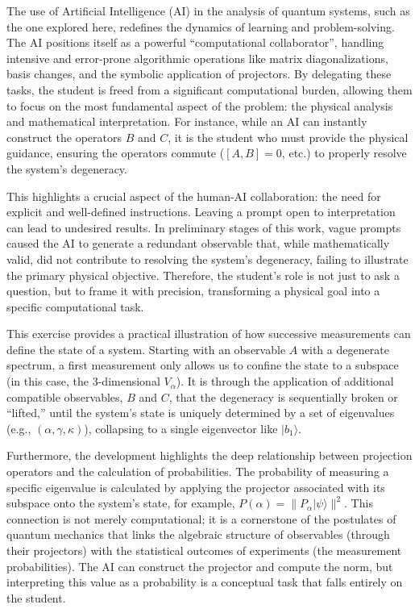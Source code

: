 \documentclass[11pt,a4paper]{article}
\begin{document}
  The use of Artificial Intelligence (AI) in the analysis of quantum systems,
  such as the one explored here, redefines the dynamics of learning and
  problem-solving. The AI positions itself as a powerful ``computational
  collaborator'', handling intensive and error-prone algorithmic operations
  like matrix diagonalizations, basis changes, and the symbolic application of
  projectors. By delegating these tasks, the student is freed from a significant
  computational burden, allowing them to focus on the most fundamental aspect of
  the problem: the physical analysis and mathematical interpretation. For
  instance, while an AI can instantly construct the operators $B$ and $C$, it is
  the student who must provide the physical guidance, ensuring the operators
  commute ($[A,B]=0$, etc.) to properly resolve the system's degeneracy.

  This highlights a crucial aspect of the human-AI collaboration: the need for
  explicit and well-defined instructions. Leaving a prompt open to
  interpretation can lead to undesired results. In preliminary stages of this
  work, vague prompts caused the AI to generate a redundant observable
  that, while mathematically valid, did not contribute to resolving the system's
  degeneracy, failing to illustrate the primary physical objective. Therefore,
  the student's role is not just to ask a question, but to frame it with
  precision, transforming a physical goal into a specific computational task.

  This exercise provides a practical illustration of how successive measurements
  can define the state of a system. Starting with an observable $A$ with a
  degenerate spectrum, a first measurement only allows us to confine the state
  to a subspace (in this case, the 3-dimensional $V_{\alpha}$). It is through
  the application of additional compatible observables, $B$ and $C$, that the
  degeneracy is sequentially broken or ``lifted,'' until the system's state is
  uniquely determined by a set of eigenvalues (e.g., $(\alpha, \gamma,
  \kappa)$), collapsing to a single eigenvector like $|b_{1}\rangle$.

  Furthermore, the development highlights the deep relationship between
  projection operators and the calculation of probabilities. The probability of
  measuring a specific eigenvalue is calculated by applying the projector
  associated with its subspace onto the system's state, for example, $P(\alpha)
  = \|P_{\alpha}|\psi\rangle\|^2$. This connection is not merely computational;
  it is a cornerstone of the postulates of quantum mechanics that links the
  algebraic structure of observables (through their projectors) with the
  statistical outcomes of experiments (the measurement probabilities). The AI
  can construct the projector and compute the norm, but interpreting this value
  as a probability is a conceptual task that falls entirely on the student.
\end{document}
